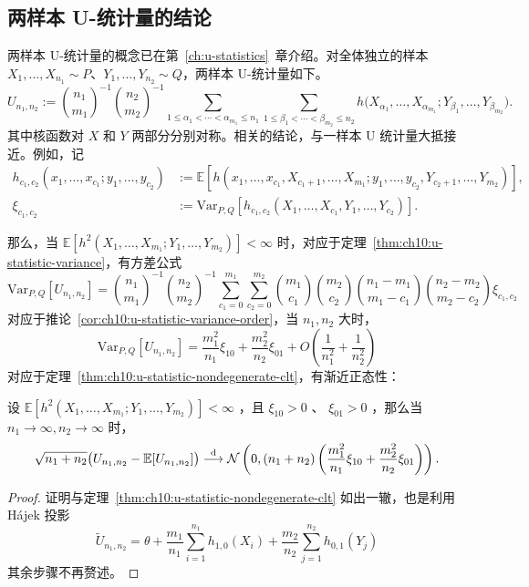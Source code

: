 \subsection{两样本 U-统计量的结论}

两样本 U-统计量的概念已在第~\ref{ch:u-statistics}~章介绍。对全体独立的样本 $X_1,\dots,X_{n_1}\sim P$、$Y_1,\dots,Y_{n_2}\sim Q$，两样本 U-统计量如下。
\[U_{n_1,n_2}:={\binom {n_1}{m_1}}^{-1}{\binom{n_2}{m_2} }^{-1}\sum_{1\le \alpha_1<\cdots<\alpha_{m_1}\le n_1}\sum_{1\le \beta_1<\cdots<\beta_{m_2}\le n_2}h\big(X_{\alpha_1},\dots,X_{\alpha_{m_1}};Y_{\beta_1},\dots,Y_{\beta_{m_2}}\big).\]其中核函数对 $X$ 和 $Y$ 两部分分别对称。相关的结论，与一样本 U 统计量大抵接近。例如，记
\begin{align*}
h_{c_1,c_2}(x_1,\dots,x_{c_1};y_1,\dots,y_{c_2})
&:=\mathbb E[h(x_1,\dots,x_{c_1},X_{c_1+1},\dots,X_{m_1};y_1,\dots,y_{c_2},Y_{c_2+1},\dots,Y_{m_2})],\\
\xi_{c_1,c_2}&:=\mathrm{Var}_{P,Q}[h_{c_1,c_2}(X_1,\dots,X_{c_1},Y_1,\dots,Y_{c_2})].
\end{align*}

那么，当 $\mathbb E[h^2(X_1,\dots,X_{m_1};Y_1,\dots,Y_{m_2})]<\infty$ 时，对应于定理~\ref{thm:ch10:u-statistic-variance}，有方差公式
\[\mathrm{Var}_{P,Q}[U_{n_1,n_2}] = \binom{n_1}{m_1}^{-1}\binom{n_2}{m_2}^{-1} \sum_{c_1=0}^{m_1}\sum_{c_2=0}^{m_2} \binom{m_1}{c_1}\binom{m_2}{c_2}\binom{n_1-m_1}{m_1-c_1}\binom{n_2-m_2}{m_2-c_2}\xi_{c_1,c_2}\]
对应于推论~\ref{cor:ch10:u-statistic-variance-order}，当 $n_1,n_2$ 大时，
\[\mathrm{Var}_{P,Q}[U_{n_1,n_2}] =\frac{m_1^2}{n_1}\xi_{10}+\frac{m^2_2}{n_2}\xi_{01}+O\left(\frac1{n_1^2}+\frac1{n_2^2}\right)\]
对应于定理~\ref{thm:ch10:u-statistic-nondegenerate-clt}，有渐近正态性：

\begin{theorem}\label{thm:ch10:two-sample-u-statistic-clt}

设 $\mathbb E[h^2(X_1,\dots,X_{m_1};Y_1,\dots,Y_{m_2})]<\infty$ ，且 $\xi_{10}>0$ 、 $\xi_{01}>0$ ，那么当 $n_1\to\infty,n_2\to\infty$ 时，
\[
\sqrt{n_1+n_2}\bigl(U_{n_1,n_2}-\mathbb E[U_{n_1,n_2}]\bigr)
\overset{\rm d}\longrightarrow
\mathcal N\left(0,(n_1+n_2)\left(
\frac{m_1^2}{n_1}\xi_{10}+\frac{m_2^2}{n_2}\xi_{01}
\right)\right).
\]

\end{theorem}

\begin{proof}
证明与定理~\ref{thm:ch10:u-statistic-nondegenerate-clt} 如出一辙，也是利用 Hájek 投影
$$\widetilde{U}_{n_1,n_2} = \theta + \frac{m_1}{n_1} \sum_{i=1}^{n_1} h_{1,0}(X_i) + \frac{m_2}{n_2} \sum_{j=1}^{n_2} h_{0,1}(Y_j)$$
其余步骤不再赘述。

\end{proof}

